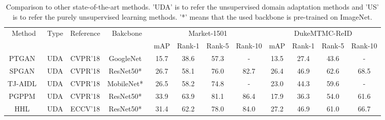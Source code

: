 \documentclass[journal]{IEEEtran}
\begin{document}
\begin{table*}
\caption{Comparison to other state-of-the-art methods. 'UDA' is to refer the unsupervised domain adaptation methods and 'US' is to refer the purely unsupervised learning methods. { '*'  means that the used backbone is pre-trained on ImageNet.
}}
\begin{center}
\begin{tabular}{|c|c|c|c|c|c|c|c|c|c|c|c|}
\hline
	\multirow{2}{*}{Method} & 
	\multirow{2}{*}{Type}&
					\multirow{2}{*}{Reference} & \multirow{2}{*}{Bakcbone} &
					\multicolumn{4}{c|}{Market-1501} &
					\multicolumn{4}{c|}{DukeMTMC-ReID} \\
					
					
	\cline{5-12}
					& & & & mAP & Rank-1 &Rank-5&Rank-10 & mAP & Rank-1 &Rank-5&Rank-10 \\
\hline\hline
PTGAN~\cite{Wei:CVPR18}&UDA&CVPR'18&GoogleNet~\cite{googlenet} &15.7 &38.6&57.3&- &13.5 &27.4&43.6&-\\
					SPGAN~\cite{Deng:CVPR18}&UDA& CVPR'18  &{ResNet50*~\cite{he:CVPR16resnet}}&26.7&58.1&76.0&82.7&26.4&46.9&62.6&68.5\\
TJ-AIDL~\cite{Wang:CVPR18}&UDA&CVPR'18&{MobileNet*~\cite{howard:2017Mobilenets}} &26.5&58.2&74.8&-&23.0&44.3&59.6&-\\
 PGPPM~\cite{Yang:arXiv18}&UDA &CVPR'18&{ResNet50*~\cite{he:CVPR16resnet}}&33.9&63.9&81.1 &86.4 &17.9&36.3&54.0 &61.6\\
HHL~\cite{Zhong:ECCV18}&UDA& ECCV'18& {ResNet50*~\cite{he:CVPR16resnet}}& 31.4&62.2 & 78.0 &84.0& 27.2&46.9 & 61.0 &66.7\\

					



\end{tabular}
\end{center}
\end{table*}
\end{document}
